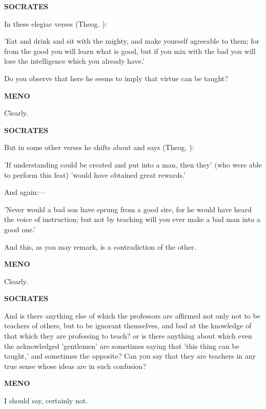\documentclass[11pt,letter]{article}
\begin{document}
\par \textbf{SOCRATES}
\par   In these elegiac verses (Theog. ):

\par  'Eat and drink and sit with the mighty, and make yourself agreeable to them; for from the good you will learn what is good, but if you mix with the bad you will lose the intelligence which you already have.'

\par  Do you observe that here he seems to imply that virtue can be taught?

\par \textbf{MENO}
\par   Clearly.

\par \textbf{SOCRATES}
\par   But in some other verses he shifts about and says (Theog. ):

\par  'If understanding could be created and put into a man, then they' (who were able to perform this feat) 'would have obtained great rewards.'

\par  And again:—

\par  'Never would a bad son have sprung from a good sire, for he would have heard the voice of instruction; but not by teaching will you ever make a bad man into a good one.'

\par  And this, as you may remark, is a contradiction of the other.

\par \textbf{MENO}
\par   Clearly.

\par \textbf{SOCRATES}
\par   And is there anything else of which the professors are affirmed not only not to be teachers of others, but to be ignorant themselves, and bad at the knowledge of that which they are professing to teach? or is there anything about which even the acknowledged 'gentlemen' are sometimes saying that 'this thing can be taught,' and sometimes the opposite? Can you say that they are teachers in any true sense whose ideas are in such confusion?

\par \textbf{MENO}
\par   I should say, certainly not.
\end{document}
